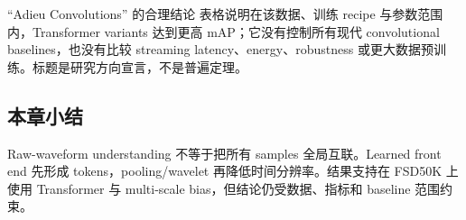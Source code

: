\begin{warningbox}{“Adieu Convolutions” 的合理结论}
表格说明在该数据、训练 recipe 与参数范围内，Transformer variants 达到更高 mAP；它没有控制所有现代 convolutional baselines，也没有比较 streaming latency、energy、robustness 或更大数据预训练。标题是研究方向宣言，不是普遍定理。
\end{warningbox}


\subsection{本章小结}

Raw-waveform understanding 不等于把所有 samples 全局互联。Learned front end 先形成 tokens，pooling/wavelet 再降低时间分辨率。结果支持在 FSD50K 上使用 Transformer 与 multi-scale bias，但结论仍受数据、指标和 baseline 范围约束。

